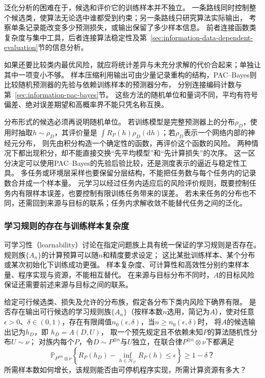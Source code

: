 泛化分析的困难在于，候选和评价它的训练样本并不独立。
一条路线同时控制整个候选类，使算法无论选中谁都受到约束；另一条路线只研究算法实际输出，
考察单条记录能改变多少预测损失，或输出保留了多少样本信息。
前者连接函数类复杂度与集中工具，后者连接算法稳定性及第~\ref{sec:information-data-dependent-evaluation}节的信息分析。

如果还要比较类内最优风险，就应将统计差异与未充分求解的代价合起来；单独让其中一项变小不够。
样本压缩利用输出可由少量记录重构的结构，PAC--Bayes则比较随机预测器的先验与依赖训练样本的预测器分布，
分别连接编码计数与第~\ref{sec:information-pac-bayes}节。
这些方法的随机单位和量词不同，平均有符号偏差、绝对误差期望和高概率界不能只凭名称互换。

分布形式的候选必须再说明随机单位。
若训练模型是完整预测器上的分布$\rho_D$，使用时抽取$h\sim\rho_D$，其评价量是
$\int R_P(h)\rho_D(\mathrm dh)$；若$\rho_D$表示一个网络内部的神经元分布，
则先由积分构造一个确定性的函数，再评价这个函数的风险。
两种情况下都出现积分，却不能直接交换“先平均模型”和“先计算损失”的次序。
这一区分决定可以使用PAC--Bayes的先验后验比较，还是测度表示的逼近与稳定性工具。
多任务或环境层采样也要保留分层结构，不能把任务数与每个任务内的记录数合并成一个样本量。
元学习以经过任务内适应后的风险评价规则，既要控制任务内有限样本误差，也要控制有限训练任务带来的误差。
若未来任务的分布也不同，还需回到来源与目标的联系；任务内求解收敛不能替代任务之间的泛化。

\subsubsection{学习规则的存在与训练样本复杂度}
\label{sec:future-analysis-learnability}

可学习性（learnability）讨论在指定问题族上具有统一保证的学习规则是否存在。
规则族$\{A_n\}$的计算预算可以随$n$和精度要求设定；
这比某批训练样本、某个分布或某次初始化下训练成功更强。
样本复杂度、可计算性和高效性分别约束样本量、程序实现与资源，不能相互替代。
在来源与目标分布不同时，$A$的目标风险保证还需要前述来源与目标之间的联系。

\begin{mathproblem}[具有统一保证的学习规则是否存在]
  \label{question:future-learnability}
  给定可行候选类、损失及允许的分布族，假定各分布下类内风险下确界有限。
  是否存在输出可行候选的学习规则族$\{A_n\}$（按样本数$n$选用，简记为$A$），使对任意
  $\epsilon>0$、$\delta\in(0,1)$，存在有限阈值$n_0(\epsilon,\delta)$，当$n\geq n_0(\epsilon,\delta)$时，
  将$A$的候选输出记为$h_D$，即
  $h_D=A(D,U)$，
  取一个预先规定且不依赖未知$P$的算法随机性分布$U\sim\nu$；
  对族内每个$P$，令$D\sim P^{\otimes n}$与$U$独立，在联合律$P^{\otimes n}\otimes\nu$下都满足
  \[
    \mathbb P_{P^{\otimes n}\otimes\nu}\!\left\{
      R_P(h_D)-\inf_{h\in\mathcal H_{\mathcal C}}R_P(h)
      \leq\epsilon
    \right\}\geq1-\delta\text{？}
  \]
  所需样本数如何增长，该规则能否由可停机程序实现，所需计算资源有多大？
\end{mathproblem}

